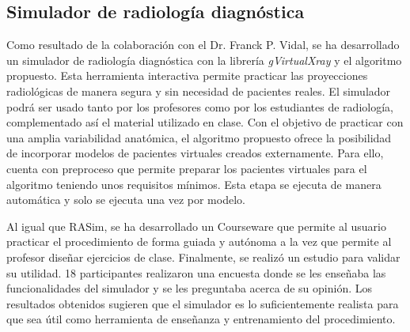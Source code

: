 

\subsection{Simulador de radiología diagnóstica}
Como resultado de la colaboración con el Dr. Franck P. Vidal, se ha desarrollado un simulador de radiología diagnóstica con la librería \emph{gVirtualXray}\cite{sujar:hal} y el algoritmo propuesto. Esta herramienta interactiva permite practicar las proyecciones radiológicas de manera segura y sin necesidad de pacientes reales.  El simulador podrá ser usado tanto por los profesores como por los estudiantes de radiología, complementado así el material utilizado en clase. Con el objetivo de practicar con una amplia variabilidad anatómica, el algoritmo propuesto ofrece la posibilidad de incorporar modelos de pacientes virtuales creados externamente. Para ello, cuenta con preproceso que permite preparar los pacientes virtuales para el algoritmo teniendo unos requisitos mínimos. Esta etapa se ejecuta de manera automática y solo se ejecuta una vez por modelo.




Al igual que \ac{RASim}, se ha desarrollado un \ac{Courseware} que permite al usuario practicar el procedimiento de forma guiada y autónoma a la vez que permite al profesor diseñar ejercicios de clase. Finalmente, se realizó un estudio para validar su utilidad. 18 participantes realizaron una encuesta donde se les enseñaba las funcionalidades del simulador y se les preguntaba acerca de su opinión. Los resultados obtenidos sugieren que el simulador es lo suficientemente realista para que sea útil como herramienta de enseñanza y entrenamiento del procedimiento.



